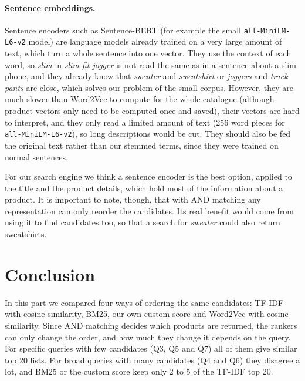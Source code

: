 \documentclass[11pt,a4paper]{article}
\begin{document}
\paragraph{Sentence embeddings.} Sentence encoders such as Sentence-BERT (for example the small \texttt{all-MiniLM-L6-v2} model) are language models already trained on a very large amount of text, which turn a whole sentence into one vector. They use the context of each word, so \emph{slim} in \emph{slim fit jogger} is not read the same as in a sentence about a slim phone, and they already know that \emph{sweater} and \emph{sweatshirt} or \emph{joggers} and \emph{track pants} are close, which solves our problem of the small corpus. However, they are much slower than Word2Vec to compute for the whole catalogue (although product vectors only need to be computed once and saved), their vectors are hard to interpret, and they only read a limited amount of text (256 word pieces for \texttt{all-MiniLM-L6-v2}), so long descriptions would be cut. They should also be fed the original text rather than our stemmed terms, since they were trained on normal sentences.

For our search engine we think a sentence encoder is the best option, applied to the title and the product details, which hold most of the information about a product. It is important to note, though, that with AND matching any representation can only reorder the candidates. Its real benefit would come from using it to find candidates too, so that a search for \emph{sweater} could also return sweatshirts.

\section{Conclusion}

In this part we compared four ways of ordering the same candidates: TF-IDF with cosine similarity, BM25, our own custom score and Word2Vec with cosine similarity. Since AND matching decides which products are returned, the rankers can only change the order, and how much they change it depends on the query. For specific queries with few candidates (Q3, Q5 and Q7) all of them give similar top 20 lists. For broad queries with many candidates (Q4 and Q6) they disagree a lot, and BM25 or the custom score keep only 2 to 5 of the TF-IDF top 20.
\end{document}
